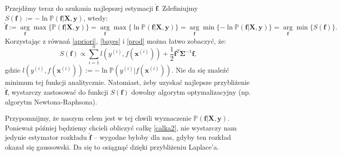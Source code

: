\documentclass{mini}
\newcommand{\argmin}{\arg\!\min}
\newcommand{\argmax}{\arg\!\max}
\begin{document}
Przejdźmy teraz do szukania najlepszej estymacji $\mathbf{\hat{f}}$. Zdefiniujmy $S(\mathbf{f}) := -\ln\mathbb{P}(\mathbf{f}|\mathbf{X}, \mathbf{y})$, wtedy: 
$$
\mathbf{\hat{f}} 
:= \underset{\mathbf{f}}\argmax \lbrace \mathbb{P}(\mathbf{f}|\mathbf{X}, \mathbf{y}) \rbrace 
= \underset{\mathbf{f}}\argmax \lbrace \ln\mathbb{P}(\mathbf{f}|\mathbf{X}, \mathbf{y}) \rbrace
= \underset{\mathbf{f}}\argmin \lbrace -\ln\mathbb{P}(\mathbf{f}|\mathbf{X}, \mathbf{y}) \rbrace
= \underset{\mathbf{f}}\argmin \lbrace S(\mathbf{f}) \rbrace.
$$
Korzystając z równań \eqref{apriori}, \eqref{bayes} i \eqref{prod} można łatwo zobaczyć, że:
$$
S(\mathbf{f}) \propto 
\sum_{i=1}^n\textit{l}(y^{(i)}, f(\mathbf{x}^{(i)})) + \frac{1}{2}\mathbf{f}^T\mathbf{\Sigma}^{-1}\mathbf{f},
$$
gdzie $\textit{l}(y^{(i)}, f(\mathbf{x}^{(i)})) := -\ln\mathbb{P}(y^{(i)} | f(\mathbf{x}^{(i)}))$.
Nie da się znaleźć minimum tej funkcji analitycznie. Natomiast, żeby uzyskać najlepsze przybliżenie $\mathbf{\hat{f}}$, wystarczy zastosować do funkcji $S(\mathbf{f})$ dowolny algorytm optymalizacyjny (np. algorytm Newtona-Raphsona).

Przypomnijmy, że naszym celem jest w tej chwili wyznaczenie $\mathbb{P}(\mathbf{f} | \textbf{X}, \textbf{y})$. Ponieważ później będziemy chcieli obliczyć całkę \eqref{calka2}, nie wystarczy nam jedynie estymator rozkładu $\mathbf{\hat{f}}$ -- wygodne byłoby dla nas, gdyby ten rozkład okazał się gaussowski. Da się to osiągnąć dzięki przybliżeniu Laplace'a. 
\end{document}
